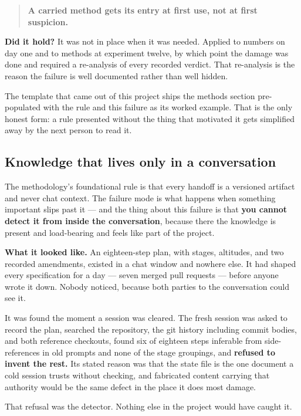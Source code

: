 \begin{quote}
\textbf{A carried method gets its entry at first use, not at first suspicion.}
\end{quote}

\textbf{Did it hold?} It was not in place when it was needed. Applied to numbers on day one and to methods at experiment twelve, by which point the damage was done and required a re-analysis of every recorded verdict. That re-analysis is the reason the failure is well documented rather than well hidden.

The template that came out of this project ships the methods section pre-populated with the rule and this failure as its worked example. That is the only honest form: a rule presented without the thing that motivated it gets simplified away by the next person to read it.

\subsection{Knowledge that lives only in a conversation}

The methodology's foundational rule is that every handoff is a versioned artifact and never chat context. The failure mode is what happens when something important slips past it --- and the thing about this failure is that \textbf{you cannot detect it from inside the conversation}, because there the knowledge is present and load-bearing and feels like part of the project.

\textbf{What it looked like.} An eighteen-step plan, with stages, altitudes, and two recorded amendments, existed in a chat window and nowhere else. It had shaped every specification for a day --- seven merged pull requests --- before anyone wrote it down. Nobody noticed, because both parties to the conversation could see it.

It was found the moment a session was cleared. The fresh session was asked to record the plan, searched the repository, the git history including commit bodies, and both reference checkouts, found six of eighteen steps inferable from side-references in old prompts and none of the stage groupings, and \textbf{refused to invent the rest.} Its stated reason was that the state file is the one document a cold session trusts without checking, and fabricated content carrying that authority would be the same defect in the place it does most damage.

That refusal was the detector. Nothing else in the project would have caught it.


